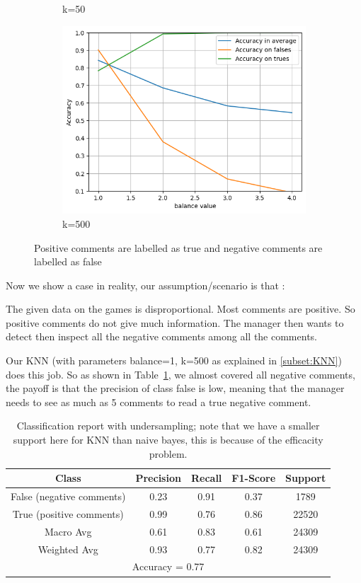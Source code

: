 \documentclass{article}
\begin{document}
\begin{figure}[H]
\begin{subfigure}[t]{0.33\textwidth}
    \caption{k=50}
  \end{subfigure}
  \hfill
  \begin{subfigure}[t]{0.33\textwidth}
    \centering
    \includegraphics[width=\linewidth]{balancek500.png}
    \caption{k=500}
  \end{subfigure}
  \caption{Positive comments are labelled as true and negative comments are labelled as false}
  \label{fig:balancenk}
\end{figure}

Now we show a case in reality, our assumption/scenario is that :

The given data on the games is disproportional. Most comments are
positive. So positive comments do not give much information.
The manager then wants to detect then inspect all the negative comments
among all the comments.

Our KNN (with parameters balance=1, k=500 as explained in \ref{subset:KNN}) does this job.
So as shown in Table~\ref{tab:KNN}, we almost covered all negative comments,
the payoff is that the precision of class false is low, meaning
that the manager needs to see as much as 5 comments to read a true negative
comment.

\begin{table}[h]
  \centering
  \begin{tabular}{ccccc}
  \hline
  Class & Precision & Recall & F1-Score & Support \\
  \hline
  False (negative comments) & 0.23 & 0.91 & 0.37 & 1789 \\
  True (positive comments) & 0.99 & 0.76 & 0.86 & 22520 \\
  \hline
  Macro Avg & 0.61 & 0.83 & 0.61 & 24309 \\
  Weighted Avg & 0.93 & 0.77 & 0.82 & 24309 \\
  \hline
  \multicolumn{5}{c}{Accuracy = 0.77} \\
  \hline
  \end{tabular}
  \caption{Classification report with undersampling; note that
  we have a smaller support here for KNN than naive bayes,
  this is because of the efficacity problem.}
  \label{tab:KNN}
\end{table}
\end{document}
